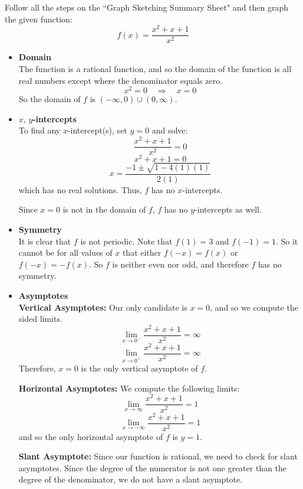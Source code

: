 \documentclass[handout, nooutcomes]{ximera}
\newcommand{\dfn}{\textbf}
\renewenvironment{freeResponse}{
\ifhandout\setbox0\vbox\bgroup\else
\begin{trivlist}\item[\hskip \labelsep\bfseries Solution:\hspace{2ex}]
\fi}
{\ifhandout\egroup\else
\end{trivlist}
\fi}
\begin{document}
\begin{problem}
Follow all the steps on the ``Graph Sketching Summary Sheet" and then graph the given function:
$$ f(x) = \frac{x^2 + x + 1}{x^2} $$

		\begin{freeResponse}  

		\begin{itemize}
		
			\item  \dfn{Domain}  \\
			The function is a rational function, and so the domain of the function is all real numbers except where the denominator equals zero.
			$$ x^2 = 0 \quad \Longrightarrow \quad x=0 $$
			So the domain of $f$ is $(-\infty ,0)\cup (0,\infty )$.
			
			
			
			\item  \dfn{$x,\, y$-intercepts}  \\
			To find any $x$-intercept(s), set $y=0$ and solve:
			$$ \frac{x^2 + x + 1}{x^2} = 0 $$
			$$ x^2 + x + 1 = 0 $$
			$$ x = \frac{-1 \pm \sqrt{1-4(1)(1)}}{2(1)} $$
			which has no real solutions.  Thus, $f$ has no $x$-intercepts.
			
			Since $x=0$ is not in the domain of $f$, $f$ has no $y$-intercepts as well.
			
			
			
			\item  \dfn{Symmetry}  \\
			
			It is clear that $f$ is not periodic.  Note that $f(1) = 3$ and $f(-1) = 1$.  So it cannot be for all values of $x$ that either $f(-x) = f(x)$ or $f(-x) = -f(x)$.  So $f$ is neither even nor odd, and therefore $f$ has no symmetry.
			
			\item  \dfn{Asymptotes}  \\
			\dfn{Vertical Asymptotes:}  Our only candidate is $x=0$, and so we compute the sided limits.
			$$ \lim_{x \to 0^-} \frac{x^2+x+1}{x^2} = \infty $$
			$$ \lim_{x \to 0^+} \frac{x^2+x+1}{x^2} = \infty $$
			Therefore, $x=0$ is the only vertical asymptote of $f$.
			
			\dfn{Horizontal Asymptotes:}  We compute the following limits:
			$$ \lim_{x \to \infty} \frac{x^2+x+1}{x^2} = 1 $$
			$$ \lim_{x \to -\infty} \frac{x^2+x+1}{x^2} = 1 $$
			and so the only horizontal asymptote of $f$ is $y=1$.
			
			\dfn{Slant Asymptote:}  Since our function is rational, we need to check for slant asymptotes.  Since the degree of the numerator is not one greater than the degree of the denominator, we do not have a slant asymptote.
			

\end{itemize}
\end{freeResponse}
\end{problem}
\end{document}
